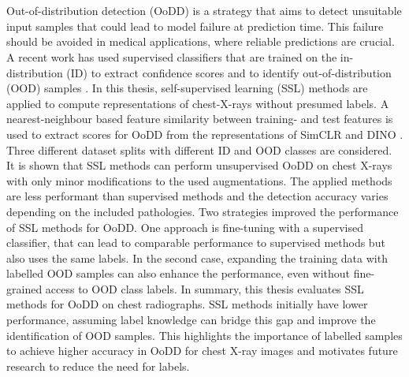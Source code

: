 \section*{}
Out-of-distribution detection (OoDD) is a strategy that aims to detect unsuitable input samples that could lead to model failure at prediction time.
This failure should be avoided in medical applications, where reliable predictions are crucial.
A recent work has used supervised classifiers that are trained on the in-distribution (ID) to extract confidence scores and to identify out-of-distribution (OOD) samples \citep{Berger2021}.
In this thesis, self-supervised learning (SSL) methods are applied to compute representations of chest-X-rays without presumed labels.
A nearest-neighbour based feature similarity between training- and test features \citep{Michels2023,Sun2022} is used to extract scores for OoDD from the representations of SimCLR \citep{Chen2020} and DINO \citep{Caron2021}.
Three different dataset splits with different ID and OOD classes are considered.  
It is shown that SSL methods can perform unsupervised OoDD on chest X-rays with only minor modifications to the used augmentations. 
The applied methods are less performant than supervised methods and the detection accuracy varies depending on the included pathologies.
Two strategies improved the performance of SSL methods for OoDD.
One approach is fine-tuning with a supervised classifier, that can lead to comparable performance to supervised methods but also uses the same labels.
In the second case, expanding the training data with labelled OOD samples \citep{Fort2021,Hendrycks2018} can also enhance the performance, even without fine-grained access to OOD class labels.
In summary, this thesis evaluates SSL methods for OoDD on chest radiographs.
SSL methods initially have lower performance, assuming label knowledge can bridge this gap and improve the identification of OOD samples. 
This highlights the importance of labelled samples to achieve higher accuracy in OoDD for chest X-ray images and motivates future research to reduce the need for labels.